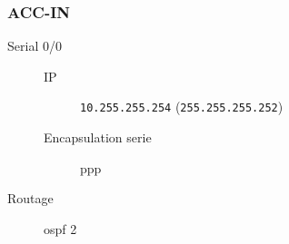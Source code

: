 \subsubsection{ACC-IN}

	\begin{description}
		\item[Serial 0/0] 
		\begin{description}
			\item[IP] \texttt{10.255.255.254} (\texttt{255.255.255.252})
			\item[Encapsulation serie] ppp
		\end{description}

		\item[Routage] ospf 2
	\end{description}
